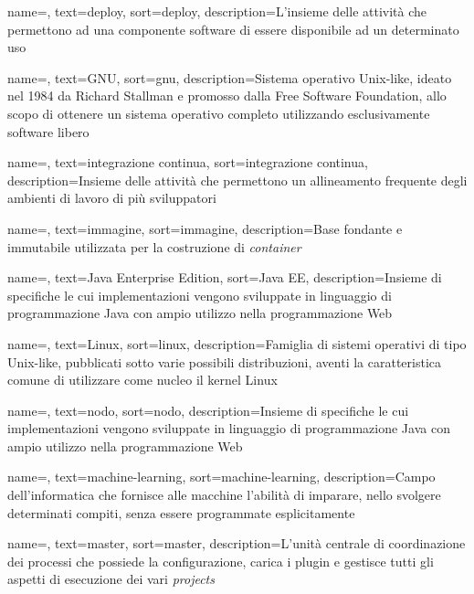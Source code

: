 {
    name=,
    text=deploy,
    sort=deploy,
    description={L'insieme delle attività che permettono ad una componente software di essere disponibile ad un determinato uso}
}

{
    name=,
    text=GNU,
    sort=gnu,
    description={Sistema operativo Unix-like, ideato nel 1984 da Richard Stallman e promosso dalla Free Software Foundation, allo scopo di ottenere un sistema operativo completo utilizzando esclusivamente software libero}
}

{
    name=,
    text=integrazione continua,
    sort=integrazione continua,
    description={Insieme delle attività che permettono un allineamento frequente degli ambienti di lavoro di più sviluppatori}
}

{
    name=,
    text=immagine,
    sort=immagine,
    description={Base fondante e immutabile utilizzata per la costruzione di \textit{container}}
}
 
{
    name=,
    text=Java Enterprise Edition,
    sort=Java EE,
    description={Insieme di specifiche le cui implementazioni vengono sviluppate in linguaggio di programmazione Java con ampio utilizzo nella programmazione Web}
}

{
    name=,
    text=Linux,
    sort=linux,
    description={Famiglia di sistemi operativi di tipo Unix-like, pubblicati sotto varie possibili distribuzioni, aventi la caratteristica comune di utilizzare come nucleo il kernel Linux}
}

{
    name=,
    text=nodo,
    sort=nodo,
    description={Insieme di specifiche le cui implementazioni vengono sviluppate in linguaggio di programmazione Java con ampio utilizzo nella programmazione Web}
}

{
    name=,
    text=machine-learning,
    sort=machine-learning,
    description={Campo dell'informatica che fornisce alle macchine l'abilità di imparare, nello svolgere determinati compiti, senza essere programmate esplicitamente}
}

{
    name=,
    text=master,
    sort=master,
    description={L'unità centrale di coordinazione dei processi che possiede la configurazione, carica i plugin e gestisce tutti gli aspetti di esecuzione dei vari \textit{projects}}
}

